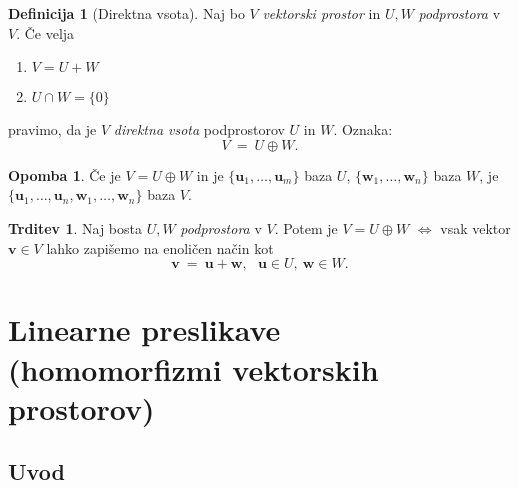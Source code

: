 \documentclass[11pt]{article}
\renewcommand{\u}{\mathbf{u}}
\newcommand{\vv}{\mathbf{v}}
\newcommand{\0}{\mathbf{0}}
\newcommand{\w}{\mathbf{w}}
\theoremstyle{definition}
\newtheorem{definicija}{Definicija}[section]
\theoremstyle{definition}
\newtheorem{trditev}{Trditev}[section]
\theoremstyle{definition}
\theoremstyle{definition}
\newtheorem*{opomba}{Opomba}
\begin{document}
\begin{definicija}[Direktna vsota]

Naj bo $V$ \textit{vektorski prostor} in $U,W$ \textit{podprostora} v $V$. Če velja
\begin{enumerate}
	\item $V=U+W$
	\item $U \cap W = \{0\}$
\end{enumerate}
pravimo, da je $V$ \textit{direktna vsota} podprostorov $U$ in $W$. Oznaka:
$$V ~=~ U \oplus W.$$

\end{definicija}
\vspace{0.5cm}

\begin{opomba}

Če je $V = U \oplus W$ in je $\{\u_1,\ldots,\u_m\}$ baza $U$, $\{\w_1,\ldots,\w_n\}$ baza $W$, je $\{\u_1,\ldots,\u_n,\w_1,\ldots,\w_n\}$ baza $V$.

\end{opomba}
\vspace{0.5cm}

\begin{trditev}

Naj bosta $U,W$ \textit{podprostora} v $V$. Potem je $V = U \oplus W$ $\iff$ vsak vektor $\vv \in V$ lahko zapišemo na enoličen način kot 
$$\vv ~=~ \u + \w, ~~~\u \in U,~\w \in W.$$

\end{trditev}
\vspace{0.5cm}


\pagebreak


\section{Linearne preslikave \\(homomorfizmi vektorskih prostorov)}
\vspace{0.5cm}


\subsection{Uvod}
\vspace{0.5cm}
\end{document}
